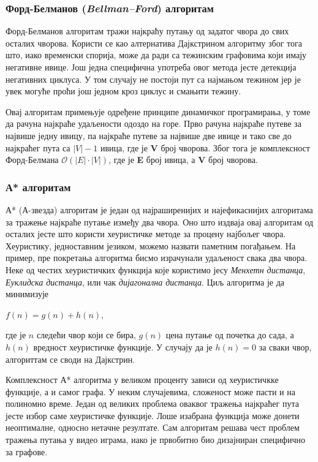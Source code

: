 \documentclass[11pt, oneside, a4paper]{article}
\begin{document}
\subsubsection*{Форд-Белманов (\textit{Bellman–Ford}) алгоритам}
Форд-Белманов алгоритам тражи најкраћу путању од задатог чвора до свих осталих чворова. Користи се као алтернатива Дајкстрином алгоритму због тога што, иако временски спорија, може да ради са тежинским графовима који имају негативне ивице. Још једна специфична употреба овог метода јесте детекција негативних циклуса. У том случају не постоји пут са најмањом тежином јер је увек могуће проћи још једном кроз циклус и смањити тежину.

\par
Овај алгоритам примењује одређене принципе динамичког програмирања, у томе да рачуна најкраће удаљености одоздо на горе. Прво рачуна најкраће путеве за највише једну ивицу, па најкраће путеве за највише две ивице и тако све до најкраћег пута са $|V|-1$ ивица, где је \textbf{V} број чворова. Због тога је комплексност Форд-Белмана $\mathcal{O}(|E| \cdot |V|)$, где је \textbf{E} број ивица, а \textbf{V} број чворова.
\subsubsection*{А* алгоритам}
А* (А-звезда) алгоритам је један од најраширенијих и најефикаснијих алгоритама за тражење најкраће путање између два чвора. Оно што издваја овај алгоритам од осталих јесте што користи хеуристичке методе за процену најбољег чвора. Хеуристику, једноставним језиком, можемо назвати \glqq паметним погађањем\grqq. На пример, пре покретања алгоритма бисмо израчунали удаљеност свака два чвора. Неке од честих хеуристичких функција које користимо јесу \textit{Менхетн дистанца}, \textit{Еуклидска дистанца}, или чак \textit{дијагонална дистанца}. Циљ алгоритма је да минимизује
\begin{center}
    $f(n) = g(n) + h(n)$,
\end{center}
где је $n$ следећи чвор који се бира, $g(n)$ цена путање од почетка до сада, а $h(n)$ вредност хеуристичке функције. У случају да је $h(n) = 0$ за сваки чвор, алгориттам се своди на Дајкстрин. \par
Комплексност А* алгоритма у великом проценту зависи од хеуристичкке функције, а и самог графа. У неким случајевима, сложеност може пасти и на полиномно време. Један од великих проблема оваквог тражења најкраћег пута јесте избор саме хеуристичке функције. Лоше изабрана функција може донети неоптималне, односно нетачне резултате. Сам алгоритам решава чест проблем тражења путања у видео играма, иако је првобитно био дизајниран специфично за графове.
\end{document}
